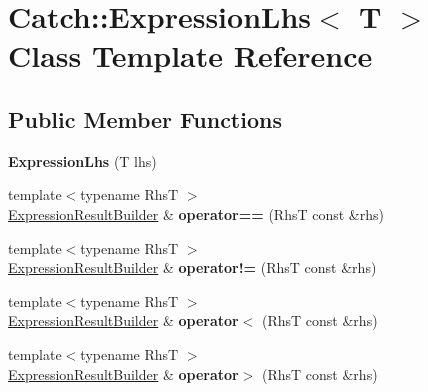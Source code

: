 \hypertarget{class_catch_1_1_expression_lhs}{\section{Catch\-:\-:Expression\-Lhs$<$ T $>$ Class Template Reference}
\label{class_catch_1_1_expression_lhs}
}
\subsection*{Public Member Functions}
\begin{DoxyCompactItemize}
\item 
\hypertarget{class_catch_1_1_expression_lhs_a22d67f6de8fd701f82ca0c91fc3a381d}{{\bfseries Expression\-Lhs} (T lhs)}\label{class_catch_1_1_expression_lhs_a22d67f6de8fd701f82ca0c91fc3a381d}

\item 
\hypertarget{class_catch_1_1_expression_lhs_ad6247606e88d1d188b0736d07c7cfc1a}{{\footnotesize template$<$typename Rhs\-T $>$ }\\\hyperlink{class_catch_1_1_expression_result_builder}{Expression\-Result\-Builder} \& {\bfseries operator==} (Rhs\-T const \&rhs)}\label{class_catch_1_1_expression_lhs_ad6247606e88d1d188b0736d07c7cfc1a}

\item 
\hypertarget{class_catch_1_1_expression_lhs_a27dc38036186c11f7c197ea3ebb20530}{{\footnotesize template$<$typename Rhs\-T $>$ }\\\hyperlink{class_catch_1_1_expression_result_builder}{Expression\-Result\-Builder} \& {\bfseries operator!=} (Rhs\-T const \&rhs)}\label{class_catch_1_1_expression_lhs_a27dc38036186c11f7c197ea3ebb20530}

\item 
\hypertarget{class_catch_1_1_expression_lhs_aff8d8124d948895897c4f2d52d39d8df}{{\footnotesize template$<$typename Rhs\-T $>$ }\\\hyperlink{class_catch_1_1_expression_result_builder}{Expression\-Result\-Builder} \& {\bfseries operator$<$} (Rhs\-T const \&rhs)}\label{class_catch_1_1_expression_lhs_aff8d8124d948895897c4f2d52d39d8df}

\item 
\hypertarget{class_catch_1_1_expression_lhs_a831eaabf3e182c8f36eede97182e513d}{{\footnotesize template$<$typename Rhs\-T $>$ }\\\hyperlink{class_catch_1_1_expression_result_builder}{Expression\-Result\-Builder} \& {\bfseries operator$>$} (Rhs\-T const \&rhs)}\label{class_catch_1_1_expression_lhs_a831eaabf3e182c8f36eede97182e513d}


\end{DoxyCompactItemize}
